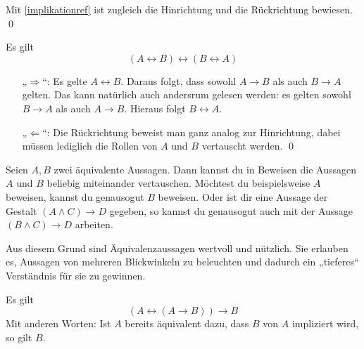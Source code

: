 \begin{bew}
    Mit \cref{implikationref} ist zugleich die Hinrichtung und die Rückrichtung bewiesen. \qed
\end{bew}


\begin{satz}\label{iffkomm}
    Es gilt
        \[ (A\leftrightarrow B)\leftrightarrow(B\leftrightarrow A) \]
\end{satz}


\begin{bew}
    \begin{enumerate}
        \item[„$\Rightarrow$“:] Es gelte $A\leftrightarrow B$. Daraus folgt, dass sowohl $A\to B$ als auch $B\to A$ gelten. Das kann natürlich auch andersrum gelesen werden: es gelten sowohl $B\to A$ als auch $A\to B$. Hieraus folgt $B\leftrightarrow A$.
        \item[„$\Leftarrow$“:] Die Rückrichtung beweist man ganz analog zur Hinrichtung, dabei müssen lediglich die Rollen von $A$ und $B$ vertauscht werden. \qed
    \end{enumerate}
\end{bew}


\begin{bem}[Substitutionsprinzip] 
    Seien $A,B$ zwei äquivalente Aussagen. Dann kannst du in Beweisen die Aussagen $A$ und $B$ beliebig miteinander vertauschen. Möchtest du beispielsweise $A$ beweisen, kannst du genausogut $B$ beweisen. Oder ist dir eine Aussage der Gestalt $(A\land C)\to D$ gegeben, so kannst du genausogut auch mit der Aussage $(B\land C)\to D$ arbeiten.
    
    Aus diesem Grund sind Äquivalenzaussagen wertvoll und nützlich. Sie erlauben es, Aussagen von mehreren Blickwinkeln zu beleuchten und dadurch ein „tieferes“ Verständnis für sie zu gewinnen.
\end{bem}


\begin{satz} \label{curryparadox}
    Es gilt
        \[ (A\leftrightarrow (A\to B))\to B \]
    Mit anderen Worten: Ist $A$ bereits äquivalent dazu, dass $B$ von $A$ impliziert wird, so gilt $B$.
\end{satz}


